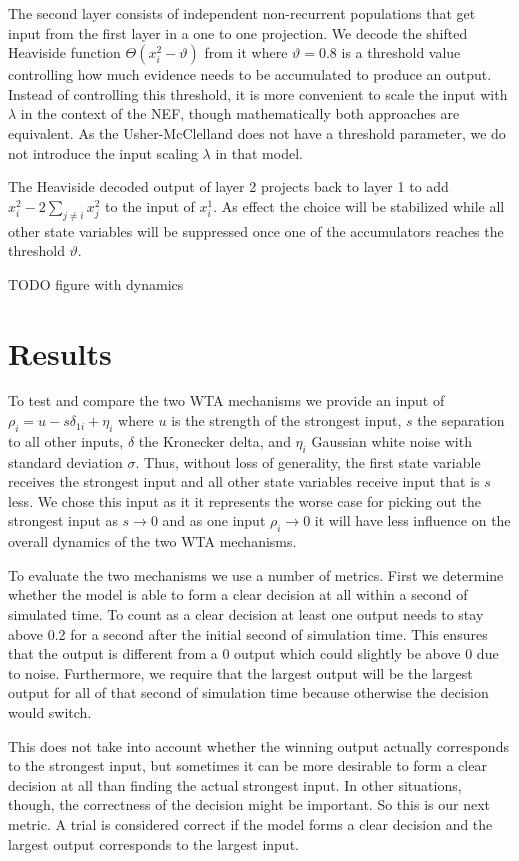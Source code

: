 \documentclass[10pt,letterpaper]{article}
\begin{document}
The second layer consists of independent non-recurrent populations that get 
input from the first layer in a one to one projection. We decode the shifted 
Heaviside function $\Theta(x^2_i - \vartheta)$ from it where $\vartheta = 0.8$ 
is a threshold value controlling how much evidence needs to be accumulated to 
produce an output. Instead of controlling this threshold, it is more convenient 
to scale the input with $\lambda$ in the context of the NEF, though 
mathematically both approaches are equivalent. As the Usher-McClelland does not 
have a threshold parameter, we do not introduce the input scaling $\lambda$ in 
that model.

The Heaviside decoded output of layer 2 projects back to layer 1 to add $x^2_i 
- 2\sum_{j \neq i} x^2_j$ to the input of $x^1_i$. As effect the choice will be 
stabilized while all other state variables will be suppressed once one of the 
accumulators reaches the threshold $\vartheta$.

TODO figure with dynamics

\section{Results}
To test and compare the two WTA mechanisms we provide an input of $\rho_i 
= u - s \delta_{1i} + \eta_i$ where $u$ is the strength of the strongest input, 
$s$ the separation to all other inputs, $\delta$ the Kronecker delta, and 
$\eta_i$ Gaussian white noise with standard deviation $\sigma$. Thus, without 
loss of generality, the first state variable receives the strongest input and 
all other state variables receive input that is $s$ less. We chose this input as 
it it represents the worse case for picking out the strongest input as $s 
\rightarrow 0$ and as one input $\rho_i \rightarrow 0$ it will have less 
influence on the overall dynamics of the two WTA mechanisms.

To evaluate the two mechanisms we use a number of metrics. First we determine 
whether the model is able to form a clear decision at all within a second of 
simulated time. To count as a clear decision at least one output needs to stay 
above 0.2 for a second after the initial second of simulation time. This ensures 
that the output is different from a 0 output which could slightly be above 
0 due to noise. Furthermore, we require that the largest output will be the 
  largest output for all of that second of simulation time because otherwise the 
  decision would switch.

This does not take into account whether the winning output actually corresponds 
to the strongest input, but sometimes it can be more desirable to form a clear 
decision at all than finding the actual strongest input. In other situations, 
though, the correctness of the decision might be important. So this is our next 
metric. A trial is considered correct if the model forms a clear decision and 
the largest output corresponds to the largest input.
\end{document}

